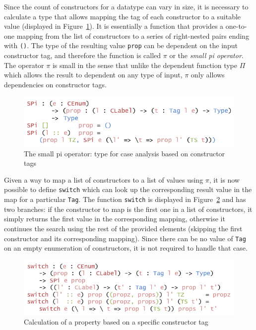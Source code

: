 \documentclass{ituthesis}
\newcommand{\tttype}[1]{\textcolor{type-color}{\texttt{#1}}}
\newcommand{\ttdec}[1]{\textcolor{declared-var-color}{\texttt{#1}}}
\newcommand{\ttvar}[1]{\textcolor{local-var-color}{\texttt{#1}}}
\theoremstyle{break}
\begin{document}
Since the count of constructors for a datatype can vary in size, it is necessary to calculate a type that allows mapping the tag of each constructor to a suitable value (displayed in Figure~\ref{fig:smallpiop}). 
It is essentially a function that provides a one-to-one mapping from the list of constructors to a series of right-nested pairs ending with \tttype{()}.
The type of the resulting value \ttvar{prop} can be dependent on the input constructor tag, and therefore the function is called $\pi$ or the \textit{small pi operator}.
The operator $\pi$ is small in the sense that unlike the dependent function type $\Pi$ which allows the result to dependent on any type of input, $\pi$ only allows dependencies on constructor tags.

\begin{figure}[ht]
\begin{center}
    \includegraphics[scale=0.5]{Figures/AConstructiveTypeofChoice.png}
\end{center}
\caption{The small pi operator: type for case analysis based on constructor tags}
\label{fig:smallpiop}
\end{figure}

Given a way to map a list of constructors to a list of values using $\pi$, it is now possible to define \ttdec{switch} which can look up the corresponding result value in the map for a particular \tttype{Tag}.
The function \ttdec{switch} is displayed in Figure~\ref{fig:switchctor} and has two branches: if the constructor to map is the first one in a list of constructors, it simply returns the first value in the corresponding mapping, otherwise
it continues the search using the rest of the provided elements (skipping the first constructor and its corresponding mapping).
Since there can be no value of \tttype{Tag} on an empty enumeration of constructors, it is not required to handle that case.

\begin{figure}[ht]
\begin{center}
    \includegraphics[scale=0.5]{Figures/AConstructiveChoice.png}
\end{center}
\caption{Calculation of a property based on a specific constructor tag}
\label{fig:switchctor}
\end{figure}
\end{document}
